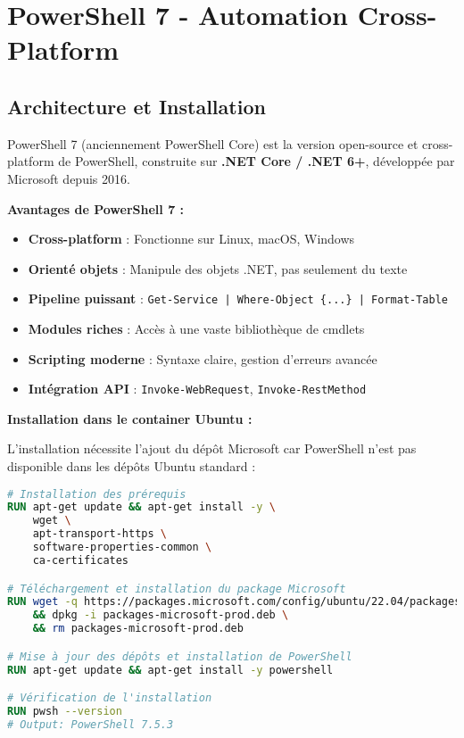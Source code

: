 \documentclass[11pt,a4paper]{report}
\begin{document}
\section{PowerShell 7 - Automation Cross-Platform}

\subsection{Architecture et Installation}

PowerShell 7 (anciennement PowerShell Core) est la version open-source et cross-platform de PowerShell, construite sur \textbf{.NET Core / .NET 6+}, développée par Microsoft depuis 2016.

\textbf{Avantages de PowerShell 7 :}
\begin{itemize}
    \item \textbf{Cross-platform} : Fonctionne sur Linux, macOS, Windows
    \item \textbf{Orienté objets} : Manipule des objets .NET, pas seulement du texte
    \item \textbf{Pipeline puissant} : \texttt{Get-Service | Where-Object \{...\} | Format-Table}
    \item \textbf{Modules riches} : Accès à une vaste bibliothèque de cmdlets
    \item \textbf{Scripting moderne} : Syntaxe claire, gestion d'erreurs avancée
    \item \textbf{Intégration API} : \texttt{Invoke-WebRequest}, \texttt{Invoke-RestMethod}
\end{itemize}

\textbf{Installation dans le container Ubuntu :}

L'installation nécessite l'ajout du dépôt Microsoft car PowerShell n'est pas disponible dans les dépôts Ubuntu standard :

\begin{lstlisting}[language=Dockerfile, caption=Installation de PowerShell 7 dans le Dockerfile, basicstyle=\ttfamily\tiny]
# Installation des prérequis
RUN apt-get update && apt-get install -y \
    wget \
    apt-transport-https \
    software-properties-common \
    ca-certificates

# Téléchargement et installation du package Microsoft
RUN wget -q https://packages.microsoft.com/config/ubuntu/22.04/packages-microsoft-prod.deb \
    && dpkg -i packages-microsoft-prod.deb \
    && rm packages-microsoft-prod.deb

# Mise à jour des dépôts et installation de PowerShell
RUN apt-get update && apt-get install -y powershell

# Vérification de l'installation
RUN pwsh --version
# Output: PowerShell 7.5.3
\end{lstlisting}
\end{document}
